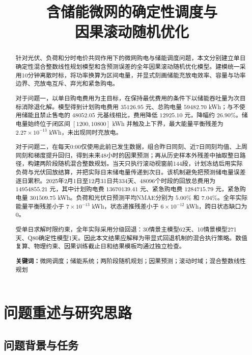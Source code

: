 \documentclass[UTF8,12pt,a4paper]{ctexart}
\title{\textbf{含储能微网的确定性调度与\\因果滚动随机优化}}
\author{}
\date{}
\newcommand{\keywords}[1]{\par\noindent\textbf{关键词：}#1}
\begin{document}
\pagestyle{plain}
\setcounter{page}{1}
\maketitle

\begin{abstract}
针对光伏、负荷和分时电价共同作用下的微网购电与储能调度问题，本文分别建立单日确定性混合整数线性规划模型和含预测误差的全年因果滚动随机优化模型。建模统一采用10分钟离散时标，将功率换算为区间电量，并显式刻画储能充放电效率、容量与功率边界、充放电互斥、弃光和紧急购电。

对于问题一，以单日购电费用为主目标，在保持最优费用的条件下以储能吞吐量为次目标消除退化解。模型得到计划购电费用 $35126.95$ 元、总购电量 $59482.70$ kWh；与不使用储能且禁止售电的 $48052.05$ 元基线相比，费用降低 $12925.10$ 元，降幅约 $26.90\%$。储电量始终位于闭区间 $[1200,10800]$ kWh 并触及上下界，最大能量平衡残差为 $2.27\times10^{-13}$ kWh，未出现同时充放电。

对于问题二，在每天0:00仅使用此前已发生数据，组合昨日同刻、近7日同刻均值、上周同刻和梯度提升回归，得到未来48小时的因果预测；再从历史样本外残差中抽取整日路径，构建两阶段随机混合整数规划。当天只执行滚动视窗前144段，计划冻结后用实际负荷与光伏回放结算，并把实际日末储电量传递到次日。该机制避免把预测储电量误差逐日累积。2025年2月1日至12月31日共334天、48096个时段的回放总费用为 $14954855.21$ 元，其中计划购电费 $13670139.41$ 元、紧急购电费 $1284715.79$ 元，紧急购电量 $301509.75$ kWh。负荷和光伏日预测平均NMAE分别为 $5.00\%$ 和 $7.04\%$。全年实际能量平衡残差小于 $7\times10^{-13}$ kWh，状态递推残差小于 $6\times10^{-12}$ kWh，跨日状态缺口为0。

受单日求解时限约束，全年实际采用分级回退：30情景主模型62天、10情景模型271天、Q80确定性模型1天。因此本文结果应解释为带显式回退机制的混合执行策略。数值复算、物理约束、因果训练截止日和结果模板均通过独立检查。

\keywords{微网调度；储能系统；两阶段随机规划；因果预测；滚动时域；混合整数线性规划}
\end{abstract}

\newpage

\section{问题重述与研究思路}

\subsection{问题背景与任务}
\end{document}

